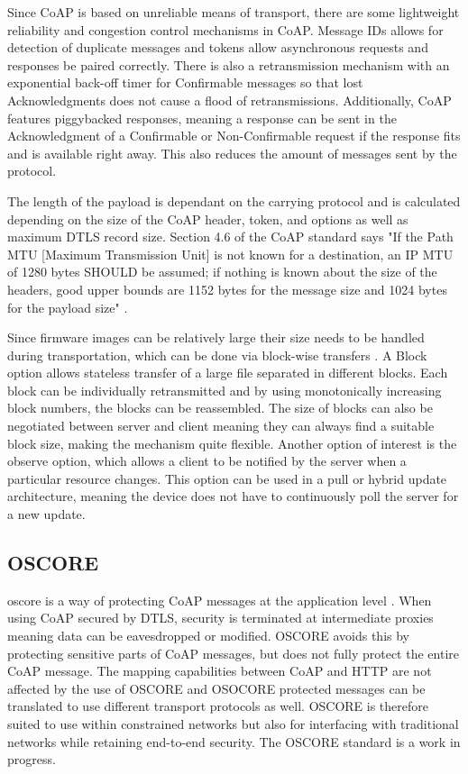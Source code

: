 \documentclass[0-thesis.tex]{subfiles}
\begin{document}
Since CoAP is based on unreliable means of transport, there are some lightweight
reliability and congestion control mechanisms in CoAP. Message IDs allows for detection of
duplicate messages and tokens allow asynchronous requests and responses be paired
correctly. There is also a retransmission mechanism with an exponential back-off timer for
Confirmable messages so that lost Acknowledgments does not cause a flood of
retransmissions. Additionally, CoAP features piggybacked responses, meaning a response can
be sent in the Acknowledgment of a Confirmable or Non-Confirmable request if the response
fits and is available right away. This also reduces the amount of messages sent by the
protocol.

The length of the payload is dependant on the carrying protocol and is calculated
depending on the size of the CoAP header, token, and options as well as maximum DTLS
record size. Section 4.6 of the CoAP standard says "If the Path MTU [Maximum Transmission
Unit] is not known for a destination, an IP MTU of 1280 bytes SHOULD be assumed; if
nothing is known about the size of the headers, good upper bounds are 1152 bytes for the
message size and 1024 bytes for the payload size" \parencite{rfc7252}.

Since firmware images can be relatively large their size needs to be handled during
transportation, which can be done via block-wise transfers \parencite{rfc7959}. A Block
option allows stateless transfer of a large file separated in different blocks. Each block
can be individually retransmitted and by using monotonically increasing block numbers, the
blocks can be reassembled. The size of blocks can also be negotiated between server and
client meaning they can always find a suitable block size, making the mechanism quite
flexible. Another option of interest is the observe option, which allows a client to be
notified by the server when a particular resource changes. This option can be used in a
pull or hybrid update architecture, meaning the device does not have to continuously poll
the server for a new update.

\subsection{OSCORE}
\label{ssec:oscore}
\gls{oscore} is a way of protecting CoAP messages at the application level
\parencite{oscore}. When using CoAP secured by DTLS, security is terminated at
intermediate proxies meaning data can be eavesdropped or modified. OSCORE avoids this by
protecting sensitive parts of CoAP messages, but does not fully protect the entire CoAP
message. The mapping capabilities between CoAP and HTTP are not affected by the use of
OSCORE and OSOCORE protected messages can be translated to use different transport
protocols as well. OSCORE is therefore suited to use within constrained networks but also
for interfacing with traditional networks while retaining end-to-end security. The OSCORE
standard is a work in progress.
\end{document}
